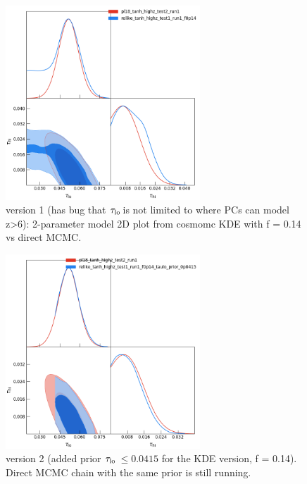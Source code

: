\documentclass[prd,amsmath,amssymb,floatfix,superscriptaddress,nofootinbib]{revtex4-1}
\newcommand{\taulo}{$\tau_{\rm lo}\,$}
\begin{document}
\begin{figure}
\includegraphics[width=0.65\textwidth]{cosmomc_kde/pl18_tanh_highz_test2_run1_vs_relike_tanh_highz_test1_run1_f0p14_tri.png}
\caption{version 1 (has bug that \taulo is not limited to where PCs can model z>6): 2-parameter model 2D plot from cosmomc KDE with f = 0.14 vs direct MCMC.
}
\label{fig:}
\end{figure}

\begin{figure}
\includegraphics[width=0.65\textwidth]{cosmomc_kde/pl18_tanh_highz_test2_run1_vs_relike_tanh_highz_test1_run1_f0p14_taulo_prior_0p0415_tri.png}
\caption{version 2 (added prior \taulo $\leq 0.0415$ for the KDE version, f = 0.14). Direct MCMC chain with the same prior is still running.
}
\label{fig:}
\end{figure}
\end{document}
